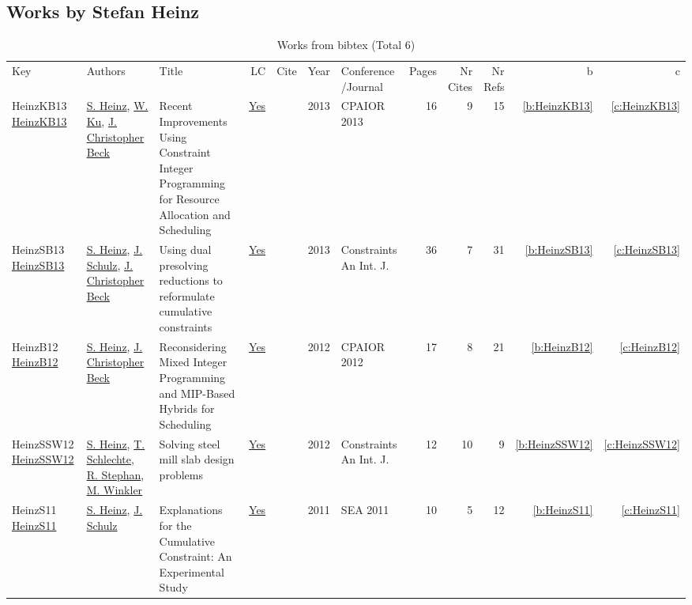 \subsection{Works by Stefan Heinz}
\label{sec:a134}
{\scriptsize
\begin{longtable}{>{\raggedright\arraybackslash}p{3cm}>{\raggedright\arraybackslash}p{6cm}>{\raggedright\arraybackslash}p{6.5cm}rrrp{2.5cm}rrrrr}
\rowcolor{white}\caption{Works from bibtex (Total 6)}\\ \toprule
\rowcolor{white}Key & Authors & Title & LC & Cite & Year & \shortstack{Conference\\/Journal} & Pages & \shortstack{Nr\\Cites} & \shortstack{Nr\\Refs} & b & c \\ \midrule\endhead
\bottomrule
\endfoot
HeinzKB13 \href{https://doi.org/10.1007/978-3-642-38171-3\_2}{HeinzKB13} & \hyperref[auth:a134]{S. Heinz}, \hyperref[auth:a337]{W. Ku}, \hyperref[auth:a89]{J. Christopher Beck} & Recent Improvements Using Constraint Integer Programming for Resource Allocation and Scheduling & \href{works/HeinzKB13.pdf}{Yes} & \cite{HeinzKB13} & 2013 & CPAIOR 2013 & 16 & 9 & 15 & \ref{b:HeinzKB13} & \ref{c:HeinzKB13}\\
HeinzSB13 \href{https://doi.org/10.1007/s10601-012-9136-9}{HeinzSB13} & \hyperref[auth:a134]{S. Heinz}, \hyperref[auth:a135]{J. Schulz}, \hyperref[auth:a89]{J. Christopher Beck} & Using dual presolving reductions to reformulate cumulative constraints & \href{works/HeinzSB13.pdf}{Yes} & \cite{HeinzSB13} & 2013 & Constraints An Int. J. & 36 & 7 & 31 & \ref{b:HeinzSB13} & \ref{c:HeinzSB13}\\
HeinzB12 \href{https://doi.org/10.1007/978-3-642-29828-8\_14}{HeinzB12} & \hyperref[auth:a134]{S. Heinz}, \hyperref[auth:a89]{J. Christopher Beck} & Reconsidering Mixed Integer Programming and MIP-Based Hybrids for Scheduling & \href{works/HeinzB12.pdf}{Yes} & \cite{HeinzB12} & 2012 & CPAIOR 2012 & 17 & 8 & 21 & \ref{b:HeinzB12} & \ref{c:HeinzB12}\\
HeinzSSW12 \href{https://doi.org/10.1007/s10601-011-9113-8}{HeinzSSW12} & \hyperref[auth:a134]{S. Heinz}, \hyperref[auth:a140]{T. Schlechte}, \hyperref[auth:a141]{R. Stephan}, \hyperref[auth:a142]{M. Winkler} & Solving steel mill slab design problems & \href{works/HeinzSSW12.pdf}{Yes} & \cite{HeinzSSW12} & 2012 & Constraints An Int. J. & 12 & 10 & 9 & \ref{b:HeinzSSW12} & \ref{c:HeinzSSW12}\\
HeinzS11 \href{https://doi.org/10.1007/978-3-642-20662-7\_34}{HeinzS11} & \hyperref[auth:a134]{S. Heinz}, \hyperref[auth:a135]{J. Schulz} & Explanations for the Cumulative Constraint: An Experimental Study & \href{works/HeinzS11.pdf}{Yes} & \cite{HeinzS11} & 2011 & SEA 2011 & 10 & 5 & 12 & \ref{b:HeinzS11} & \ref{c:HeinzS11}\\

\end{longtable}}
